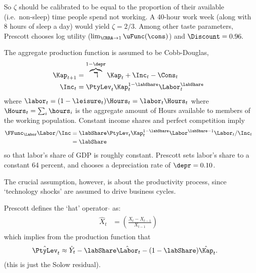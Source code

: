 So $\zeta$ should be calibrated to be equal to the proportion of their
available (i.e.\  non-sleep) time people spend not working.  A 40-hour
work week (along with 8 hours of sleep a day) would yield $\zeta =
2/3$.  Among other taste parameters, Prescott chooses log utility
($\lim_{\CRRA \rightarrow 1}\uFunc(\cons)$) and $\Discount = 0.96.$

The aggregate production function is assumed to be Cobb-Douglas,
\begin{equation}\begin{gathered}\begin{aligned}
        \Kap_{t+1} & =  \overbrace{\daleth}^{1-\depr} \Kap_{t}+\Inc_{t}-\Cons_{t}  \\
        \Inc_{t} & =  \PtyLev_{t}\Kap_{t}^{1-\labShare}\Labor_{t}^{\labShare}
\end{aligned}\end{gathered}\end{equation}
where $\labor_{t} = (1-\leisure_{t})\Hours_{t} = \labor_{t}\Hours_{t}$
where $\Hours_{t}=\sum_{i} \hours_{i}$ is the aggregate amount of
Hours available to members of the working population. Constant income
shares and perfect competition imply
\begin{equation}\begin{gathered}\begin{aligned}
        \FFunc_{\Labor}\Labor/\Inc & =  \labShare \PtyLev_{t}\Kap_{t}^{1-\labShare}\Labor^{\labShare-1}\Labor_{t}/\Inc_{t}  \\
         & =  \labShare
\end{aligned}\end{gathered}\end{equation}
so that labor's share of GDP is roughly constant.  Prescott sets
labor's share to a constant 64 percent, and chooses a depreciation
rate of $\depr = 0.10$.

The crucial assumption, however, is about the productivity process,
since `technology shocks' are assumed to drive business cycles.

Prescott defines the `hat' operator $\hat{}$ as:
\begin{equation}\begin{gathered}\begin{aligned}
        \hat{X}_{t} & =  \left(\frac{X_{t}-X_{t-1}}{X_{t-1}}\right)
\end{aligned}\end{gathered}\end{equation}
which implies from the production function that
\begin{equation}\begin{gathered}\begin{aligned}
        \hat{\PtyLev}_{t} & \approx  \hat{Y}_{t}-\labShare \hat{\Labor}_{t} - (1-\labShare)\hat{\Kap}_{t}.
\end{aligned}\end{gathered}\end{equation}
(this is just the Solow residual).

